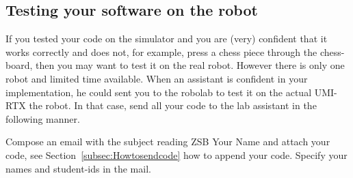 \documentclass[10pt]{scrartcl}
\begin{document}
%
%
%
%

\subsection{Testing your software on the robot}
If you tested your code on the simulator and you are (very) confident
that it works correctly and does not, for example, press a chess piece
through the chess-board, then you may want to test it on the real robot.
However there is only one robot and limited time available.
When an assistant is confident in your implementation, he could sent you to the robolab
to test it on the actual UMI-RTX  the robot. In that case, send
all your code to the lab assistant in the following manner.

Compose an email with the subject reading {\ttfamily\small ZSB Your
Name} and attach your code, see Section~\ref{subsec:Howtosendcode} how to append
your code. Specify your names and student-ids in the mail.
\end{document}
